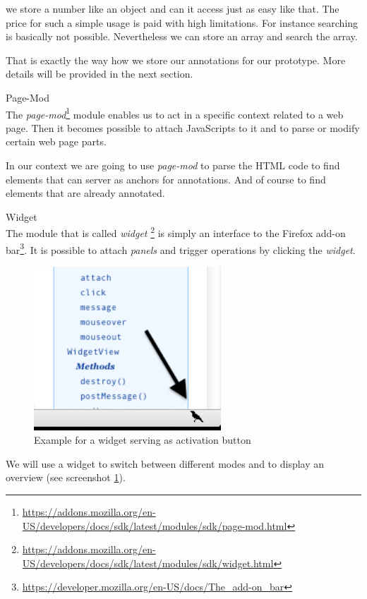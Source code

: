 \begin{description}
we store a number like an object and can it access just as easy like that. The price for such a simple usage is paid with high limitations. For instance searching is basically not possible. Nevertheless we can store an array and search the array. 

That is exactly the way how we store our annotations for our prototype. More details will be provided in the next section.

\item Page-Mod\\
The \emph{page-mod}\footnote{\url{https://addons.mozilla.org/en-US/developers/docs/sdk/latest/modules/sdk/page-mod.html}} module enables us to act in a specific context related to a web page. Then it becomes possible to attach JavaScripts to it and to parse or modify certain web page parts.

In our context we are going to use \emph{page-mod} to parse the HTML code to find elements that can server as anchors for annotations. And of course to find elements that are already annotated.

\item Widget\\
The module that is called \emph{widget} \footnote{\url{https://addons.mozilla.org/en-US/developers/docs/sdk/latest/modules/sdk/widget.html}} is simply an interface to the Firefox add-on bar\footnote{\url{https://developer.mozilla.org/en-US/docs/The_add-on_bar}}. It is possible to attach \emph{panels} and trigger operations by clicking the \emph{widget}. 

\begin{figure}[h!] \centering
		\includegraphics[width=7cm]{images/example-widget.png}
		\caption{Example for a widget serving as activation button}
		\label{example-widget}
\end{figure} 

We will use a widget to switch between different modes and to display an overview (see screenshot \ref{example-widget}). 


\end{description}
